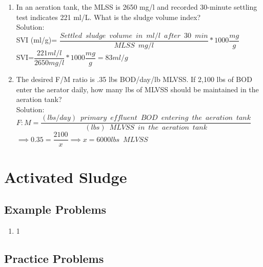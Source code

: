 \documentclass{article}
\begin{document}
\begin{enumerate}
\item In an aeration tank, the MLSS is 2650 mg/l and recorded 30-minute settling test indicates 221 ml/L.  What is the sludge volume index?\\
\vspace{0.3cm}
Solution:\\
SVI (ml/g)= $\dfrac{Settled \enspace sludge \enspace volume \enspace in \enspace ml/l \enspace after \enspace 30 \enspace min}{MLSS \enspace mg/l}*1000 \dfrac{mg}{g}$\\
\vspace{0.5cm}
SVI=$\dfrac{221ml/l}{2650mg/l}*1000\dfrac{mg}{g}=\boxed{83ml/g}$
\item The desired F/M ratio is .35 lbs BOD/day/lb MLVSS. If 2,100 lbs of BOD enter the aerator daily, how many lbs of MLVSS should be maintained in the aeration tank?\\
Solution:\\
$F:M=\dfrac{(lbs/day) \enspace primary \enspace effluent  \enspace BOD \enspace entering \enspace the  \enspace aeration \enspace tank}{(lbs) \enspace MLVSS \enspace in \enspace the  \enspace aeration \enspace tank}$\\
\vspace{0.3cm}
$\implies 0.35=\dfrac{2100}{x}\implies x = \boxed{6000lbs \enspace MLVSS}$\\

\end{enumerate}


\section{Activated Sludge}

\subsection{Example Problems} 

\begin{enumerate}

\item 1



\end{enumerate}

\subsection{Practice Problems} 
\end{document}
